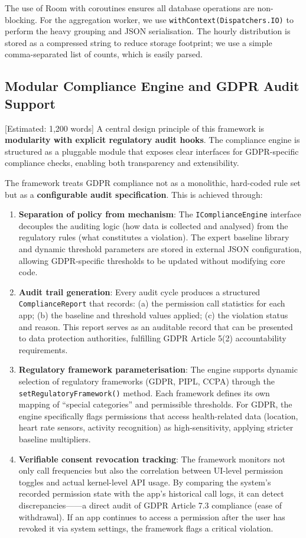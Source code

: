 The use of Room with coroutines ensures all database operations are non-blocking. For the aggregation worker, we use \texttt{withContext(Dispatchers.IO)} to perform the heavy grouping and JSON serialisation. The hourly distribution is stored as a compressed string to reduce storage footprint; we use a simple comma-separated list of counts, which is easily parsed.

\subsection{Modular Compliance Engine and GDPR Audit Support} [Estimated: 1,200 words]
A central design principle of this framework is \textbf{modularity with explicit regulatory audit hooks}. The compliance engine is structured as a pluggable module that exposes clear interfaces for GDPR-specific compliance checks, enabling both transparency and extensibility.

The framework treats GDPR compliance not as a monolithic, hard-coded rule set but as a \textbf{configurable audit specification}. This is achieved through:

\begin{enumerate}
\item \textbf{Separation of policy from mechanism}: The \texttt{IComplianceEngine} interface decouples the auditing logic (how data is collected and analysed) from the regulatory rules (what constitutes a violation). The expert baseline library and dynamic threshold parameters are stored in external JSON configuration, allowing GDPR-specific thresholds to be updated without modifying core code.
\item \textbf{Audit trail generation}: Every audit cycle produces a structured \texttt{ComplianceReport} that records: (a) the permission call statistics for each app; (b) the baseline and threshold values applied; (c) the violation status and reason. This report serves as an auditable record that can be presented to data protection authorities, fulfilling GDPR Article 5(2) accountability requirements.
\item \textbf{Regulatory framework parameterisation}: The engine supports dynamic selection of regulatory frameworks (GDPR, PIPL, CCPA) through the \texttt{setRegulatoryFramework()} method. Each framework defines its own mapping of ``special categories'' and permissible thresholds. For GDPR, the engine specifically flags permissions that access health-related data (location, heart rate sensors, activity recognition) as high-sensitivity, applying stricter baseline multipliers.
\item \textbf{Verifiable consent revocation tracking}: The framework monitors not only call frequencies but also the correlation between UI-level permission toggles and actual kernel-level API usage. By comparing the system's recorded permission state with the app's historical call logs, it can detect discrepancies——a direct audit of GDPR Article 7.3 compliance (ease of withdrawal). If an app continues to access a permission after the user has revoked it via system settings, the framework flags a critical violation.
\end{enumerate}

